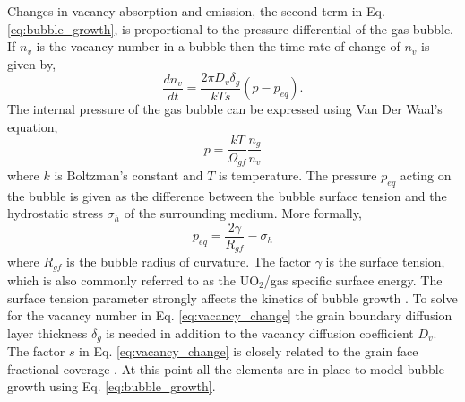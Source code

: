 Changes in vacancy absorption and emission, the second term in Eq. \ref{eq:bubble_growth}, is proportional to the pressure differential of the gas bubble. If $n_v$ is the vacancy number in a bubble then the time rate of change of $n_v$ is given by,
\begin{equation}
\label{eq:vacancy_change}
 \frac{dn_v}{dt} = \frac{2\pi D_v \delta_g}{kTs}\left(p - p_{eq}\right).
\end{equation}    
The internal pressure of the gas bubble can be expressed using Van Der Waal's equation,
\begin{equation}
\label{eq:interal_gas_pressure}
 p = \frac{kT}{\Omega_{gf}} \frac{n_g}{n_v}
\end{equation}
where $k$ is Boltzman's constant and $T$ is temperature. The pressure $p_{eq}$ acting on the bubble is given as the difference between the bubble surface tension and the hydrostatic stress $\sigma_h$ of the surrounding medium. More formally,
\begin{equation}
\label{eq:external_gas_pressure}
 p_{eq} = \frac{2\gamma}{R_{gf}} - \sigma_h
\end{equation} 
where $R_{gf}$ is the bubble radius of curvature. The factor $\gamma$ is the surface tension, which is also commonly referred to as the UO$_2$/gas specific surface energy. The surface tension parameter strongly affects the kinetics of bubble growth \cite{Swiler3}. To solve for the vacancy number in Eq. \ref{eq:vacancy_change} the grain boundary diffusion layer thickness $\delta_g$ is needed in addition to the vacancy diffusion coefficient $D_v$. The factor $s$ in Eq. \ref{eq:vacancy_change} is closely related to the grain face fractional coverage \cite{Pastore1}. At this point all the elements are in place to model bubble growth using Eq. \ref{eq:bubble_growth}.  

  


